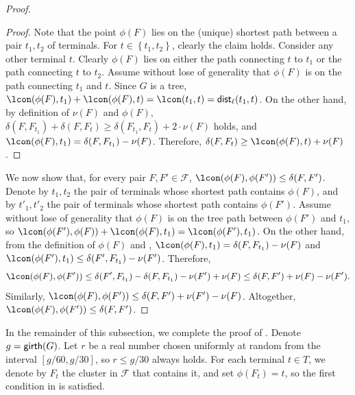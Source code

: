\documentclass[11pt]{article}
\theoremstyle{definition}
\newcommand{\set}[1]{\left\{ #1 \right\}}
\newcommand{\fset}{{\mathcal{F}}}
\newcommand{\dist}{\textnormal{\textsf{dist}}}
\newcommand{\gir}{\textnormal{\textsf{girth}}}
\newcounter{note}
\begin{document}
\begin{proof}
\begin{proof}
Note that the point $\phi(F)$ lies on the (unique) shortest path between a pair $t_1,t_2$ of terminals.
For $t\in \set{t_1,t_2}$, clearly the claim holds.
Consider any other terminal $t$. Clearly $\phi(F)$ lies on either the path connecting $t$ to $t_1$ or the path connecting $t$ to $t_2$. 
Assume without lose of generality that $\phi(F)$ is on the path connecting $t_1$ and $t$.
Since $G$ is a tree, $\lcon(\phi(F),t_1)+\lcon(\phi(F),t) = \lcon(t_1,t) = \dist_{\ell}(t_1,t)$. On the other hand, by definition of $\nu(F)$ and $\phi(F)$, $\delta(F,F_{t_1})+\delta(F,F_t) \ge \delta(F_{t_1},F_{t}) + 2 \cdot\nu(F)$ holds, and $\lcon(\phi(F),t_1) = \delta(F,F_{t_1}) - \nu(F)$. Therefore, $\delta(F,F_t) \ge \lcon(\phi(F),t) + \nu(F)$.
\end{proof}
    
We now show that, for every pair $F,F'\in \fset$, $\lcon(\phi(F),\phi(F')) \le \delta(F,F')$. 
Denote by $t_1,t_2$ the pair of terminals whose shortest path contains $\phi(F)$, and by $t'_1,t'_2$ the pair of terminals whose shortest path contains $\phi(F')$.
Assume without lose of generality that $\phi(F)$ is on the tree path between $\phi(F')$ and $t_1$, so $\lcon(\phi(F'),\phi(F)) + \lcon(\phi(F),{t_1}) = \lcon(\phi(F'),{t_1})$. On the other hand, from the definition of $\phi(F)$ and , $\lcon(\phi(F),{t_1}) = \delta(F,F_{t_1}) - \nu(F)$ and $\lcon(\phi(F'),{t_1}) \le \delta(F',F_{t_1}) - \nu(F')$. Therefore, 
$$\lcon(\phi(F),\phi(F')) \le \delta(F',F_{t_1}) - \delta(F,F_{t_1}) - \nu(F') + \nu(F) \le \delta(F,F') + \nu(F) - \nu(F').$$ Similarly, $\lcon(\phi(F),\phi(F')) \le \delta(F,F') + \nu(F') - \nu(F)$. Altogether, $\lcon(\phi(F),\phi(F')) \le \delta(F,F')$.
\end{proof}


In the remainder of this subsection, we complete the proof of .
Denote $g=\gir(G)$. 
Let $r$ be a real number chosen uniformly at random from the interval $[g/60,g/30]$, so $r\le g/30$ always holds.
For each terminal $t\in T$, we denote by $F_t$ the cluster in $\fset$ that contains it, and set $\phi(F_t)=t$, so the first condition in  is satisfied.
\end{document}
